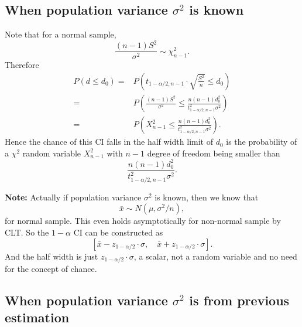 \documentclass[a4paper,12pt]{article}
\begin{document}
\subsection{When population variance $\sigma^2$ is known}
\label{sec:when-popul-vari}

Note that for a normal sample,
\[
  \frac{\left(n - 1\right)S^2}{\sigma^2} \sim \chi^2_{n - 1}
  .
\]
Therefore
\[
  \begin{aligned}
    P\left(
      d \leq d_0
    \right)
    =& P\left(
      t_{1 - \alpha / 2, n - 1}
      \cdot \sqrt{\frac{S^2}{n}}
      \leq d_0
    \right)    \\
    =& P\left(
      \frac{\left(n - 1\right)S^2}{\sigma^2}
      \leq \frac{
        n\left(n - 1\right)d_0^2
      }{
        t_{1 - \alpha / 2, n - 1}^2
        \sigma^2
      }
    \right)    \\
    =& P\left(
      X_{n - 1}^2 \leq
      \frac{
        n\left(n - 1\right)d_0^2
      }{
        t_{1 - \alpha / 2, n - 1}^2
        \sigma^2
      }
    \right)
    .
  \end{aligned}
\]
Hence the chance of this CI falls in the half width limit of $d_0$ is the probability of a $\chi^2$ random variable $X^2_{n - 1}$ with $n - 1$ degree of freedom being smaller than
\[
  \frac{
    n\left(n - 1\right)d_0^2
  }{
    t_{1 - \alpha / 2, n - 1}^2
    \sigma^2
  }
  .
\]

\textbf{Note:} Actually if population variance $\sigma^2$ is known, then we know that
\[
  \bar{x}\sim N\left(\mu, \sigma^2 / n\right),
\]
for normal sample. This even holds asymptotically for non-normal sample by CLT. So the $1 - \alpha$ CI can be constructed as
\[
  \left[
    \bar{x}
    - z_{1 - \alpha / 2}
    \cdot \sigma
    ,\quad
    \bar{x}
    + z_{1 - \alpha / 2}
    \cdot \sigma
  \right]
  .  
\]
And the half width is just $z_{1 - \alpha / 2}\cdot \sigma$, a scalar, not a random variable and no need for the concept of chance.

\subsection{When population variance $\sigma^2$ is from previous estimation}
\label{sec:when-popul-vari-1}
\end{document}
